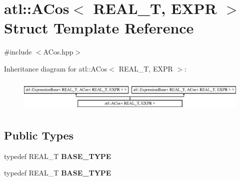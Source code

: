 \hypertarget{structatl_1_1_a_cos}{\section{atl\+:\+:A\+Cos$<$ R\+E\+A\+L\+\_\+\+T, E\+X\+P\+R $>$ Struct Template Reference}
\label{structatl_1_1_a_cos}
}


{\ttfamily \#include $<$A\+Cos.\+hpp$>$}

Inheritance diagram for atl\+:\+:A\+Cos$<$ R\+E\+A\+L\+\_\+\+T, E\+X\+P\+R $>$\+:\begin{figure}[H]
\begin{center}
\leavevmode
\includegraphics[height=1.595442cm]{structatl_1_1_a_cos}
\end{center}
\end{figure}
\subsection*{Public Types}
\begin{DoxyCompactItemize}
\item 
\hypertarget{structatl_1_1_a_cos_ac9971cad609b85379bbdf87f3199cce9}{typedef R\+E\+A\+L\+\_\+\+T {\bfseries B\+A\+S\+E\+\_\+\+T\+Y\+P\+E}}\label{structatl_1_1_a_cos_ac9971cad609b85379bbdf87f3199cce9}

\item 
\hypertarget{structatl_1_1_a_cos_ac9971cad609b85379bbdf87f3199cce9}{typedef R\+E\+A\+L\+\_\+\+T {\bfseries B\+A\+S\+E\+\_\+\+T\+Y\+P\+E}}\label{structatl_1_1_a_cos_ac9971cad609b85379bbdf87f3199cce9}

\end{DoxyCompactItemize}
